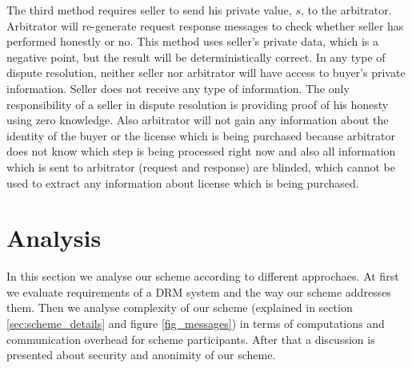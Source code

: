 \documentclass[times]{secauth}
\begin{document}
The third method requires seller to send his private value, $s$, to the arbitrator. Arbitrator will re-generate request response messages to check whether seller has performed honestly or no. This method uses seller's private data, which is a negative point, but the result will be deterministically correct.
In any type of dispute resolution, neither seller nor arbitrator will have access to buyer's private information. Seller does not receive any type of information. The only responsibility of a seller in dispute resolution is providing proof of his honesty using zero knowledge. Also arbitrator will not gain any information about the identity of the buyer or the license which is being purchased because arbitrator does not know which step is being processed right now and also all information which is sent to arbitrator (request and response) are blinded, which cannot be used to extract any information about license which is being purchased.

\section{Analysis}
\label{sec:analysis}
In this section we analyse our scheme according to different approchaes. At first we evaluate requirements of a DRM system and the way our scheme addresses them. Then we analyse complexity of our scheme (explained in section \ref{sec:scheme_details} and figure \ref{fig_messages}) in terms of computations and communication overhead for scheme participants. After that a discussion is presented about security and anonimity of our scheme. 
\end{document}
